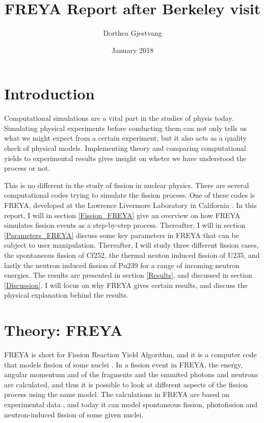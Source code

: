 \documentclass[]{article}
\title{}
\author{}
\begin{document}
	
\title{FREYA Report after Berkeley visit}
\author{Dorthea Gjestvang}
\date{January 2018}

\maketitle

\section{Introduction}
Computational simulations are a vital part in the studies of physis today. Simulating physical experiments before conducting them can not only tells us what we might expect from a certain experiment, but it also acts as a quality check of physical models. Implementing theory and comparing computational yields to experimental results gives insight on wheter we have understood the process or not.\par 
\vspace{3mm}
This is no different in the study of fission in nuclear physics. There are several computational codes trying to simulate the fission process. One of these codes is FREYA, developed at the Lawrence Livermore Laboratory in California \cite{FREYAusemanual}. In this report, I will in section \ref{Fission_FREYA} give an overview on how FREYA simulates fission events as a step-by-step process. Thereafter, I will in section \ref{Parameters_FREYA} discuss some key parameters in FREYA that can be subject to user manipulation. Thereafter, I will study three different fission cases, the spontaneous fission of Cf252, the thermal neuton induced fission of U235, and lastly the neutron induced fission of Pu239 for a range of incoming neutron energies. The results are presented in section \ref{Results}, and discussed in section \ref{Discussion}. I will focus on why FREYA gives certain results, and discuss the physical explanation behind the results.

\section{Theory: FREYA}
FREYA is short for Fission Reaction Yield Algorithm, and it is a computer code that models fission of some nuclei \cite{FREYAusemanual}. In a fission event in FREYA, the energy, angular momentum and of the fragments and the emmited photons and neutrons are calculated, and thus it is possible to look at different aspects of the fission process using the same model. The calculations in FREYA are based on experimental data \cite{FREYAusemanual}, and today it can model spontaneous fission, photofission and neutron-induced fission of some given nuclei.
\end{document}

